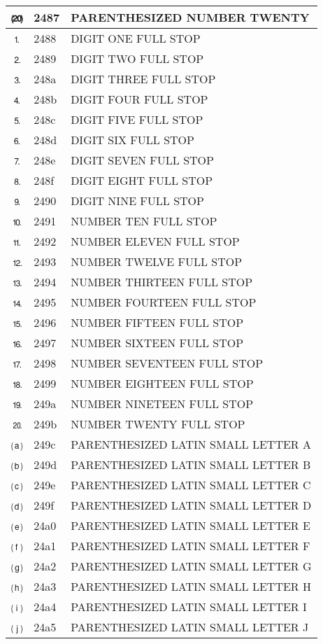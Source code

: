\documentclass[12pt,letterpaper,openany]{book}
\begin{document}
\begin{center}
\begin{supertabular}{|m{0.25in}|m{0.5in}|m{4in}|}
⒇ & 2487 & PARENTHESIZED NUMBER TWENTY\\\hline
⒈ & 2488 & DIGIT ONE FULL STOP\\\hline
⒉ & 2489 & DIGIT TWO FULL STOP\\\hline
⒊ & 248a & DIGIT THREE FULL STOP\\\hline
⒋ & 248b & DIGIT FOUR FULL STOP\\\hline
⒌ & 248c & DIGIT FIVE FULL STOP\\\hline
⒍ & 248d & DIGIT SIX FULL STOP\\\hline
⒎ & 248e & DIGIT SEVEN FULL STOP\\\hline
⒏ & 248f & DIGIT EIGHT FULL STOP\\\hline
⒐ & 2490 & DIGIT NINE FULL STOP\\\hline
⒑ & 2491 & NUMBER TEN FULL STOP\\\hline
⒒ & 2492 & NUMBER ELEVEN FULL STOP\\\hline
⒓ & 2493 & NUMBER TWELVE FULL STOP\\\hline
⒔ & 2494 & NUMBER THIRTEEN FULL STOP\\\hline
⒕ & 2495 & NUMBER FOURTEEN FULL STOP\\\hline
⒖ & 2496 & NUMBER FIFTEEN FULL STOP\\\hline
⒗ & 2497 & NUMBER SIXTEEN FULL STOP\\\hline
⒘ & 2498 & NUMBER SEVENTEEN FULL STOP\\\hline
⒙ & 2499 & NUMBER EIGHTEEN FULL STOP\\\hline
⒚ & 249a & NUMBER NINETEEN FULL STOP\\\hline
⒛ & 249b & NUMBER TWENTY FULL STOP\\\hline
⒜ & 249c & PARENTHESIZED LATIN SMALL LETTER A\\\hline
⒝ & 249d & PARENTHESIZED LATIN SMALL LETTER B\\\hline
⒞ & 249e & PARENTHESIZED LATIN SMALL LETTER C\\\hline
⒟ & 249f & PARENTHESIZED LATIN SMALL LETTER D\\\hline
⒠ & 24a0 & PARENTHESIZED LATIN SMALL LETTER E\\\hline
⒡ & 24a1 & PARENTHESIZED LATIN SMALL LETTER F\\\hline
⒢ & 24a2 & PARENTHESIZED LATIN SMALL LETTER G\\\hline
⒣ & 24a3 & PARENTHESIZED LATIN SMALL LETTER H\\\hline
⒤ & 24a4 & PARENTHESIZED LATIN SMALL LETTER I\\\hline
⒥ & 24a5 & PARENTHESIZED LATIN SMALL LETTER J\\\hline

\end{supertabular}
\end{center}
\end{document}
